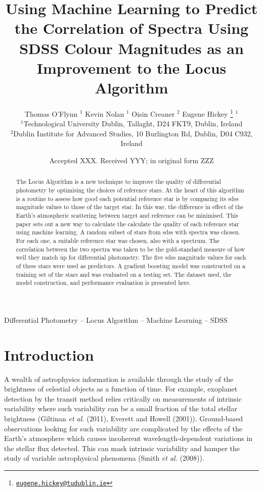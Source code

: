 \documentclass[a4paper,fleqn,usenatbib]{mnras}
\title[Predicting Correlation of Spectra Using SDSS Colour
Magnitudes]{Using Machine Learning to Predict the Correlation of Spectra
Using SDSS Colour Magnitudes as an Improvement to the Locus Algorithm}
\author[E. Hickey et al.]{
	Thomas O'Flynn
				$^{1}$
		Kevin Nolan
				$^{1}$
		Oisin Creaner
				$^{2}$
		Eugene Hickey
			\thanks{\href{mailto:eugene.hickey@tudublin.ie}{\nolinkurl{eugene.hickey@tudublin.ie}}}
				$^{1}$
	\\
			$^{1}$Technological University Dublin, Tallaght, D24 FKT9, Dublin,
Ireland\\
			$^{2}$Dublin Institute for Advanced Studies, 10 Burlington Rd,
Dublin, D04 C932, Ireland}
\date{Accepted XXX. Received YYY; in original form ZZZ}
\begin{document}
\label{firstpage}
\pagerange{\pageref{firstpage}--\pageref{lastpage}}


\maketitle

\begin{abstract}
The Locus Algorithm is a new technique to improve the quality of
differential photometry by optimising the choices of reference stars. At
the heart of this algorithm is a routine to assess how good each
potential reference star is by comparing its sdss magnitude values to
those of the target star. In this way, the difference in effect of the
Earth's atmospheric scattering between target and reference can be
minimised. This paper sets out a new way to calculate the calculate the
quality of each reference star using machine learning. A random subset
of stars from sdss with spectra was chosen. For each one, a suitable
reference star was chosen, also with a spectrum. The correlation between
the two spectra was taken to be the gold-standard measure of how well
they match up for differential photometry. The five sdss magnitude
values for each of these stars were used as predictors. A gradient
boosting model was constructed on a training set of the stars and was
evaluated on a testing set. The dataset used, the model construction,
and performance evaluation is presented here.
\end{abstract}

\begin{keywords}
Differential Photometry -- Locus Algorithm -- Machine Learning -- SDSS
\end{keywords}



\hypertarget{introduction}{%
\section{Introduction}\label{introduction}}

A wealth of astrophysics information is available through the study of
the brightness of celestial objects as a function of time. For example,
exoplanet detection by the transit method relies critically on
measurements of intrinsic variability where such variability can be a
small fraction of the total stellar brightness (Giltinan \emph{et al.}
(2011), Everett and Howell (2001)). Ground-based observations looking
for such variability are complicated by the effects of the Earth's
atmosphere which causes incoherent wavelength-dependent variations in
the stellar flux detected. This can mask intrinsic variability and
hamper the study of variable astrophysical phenomena (Smith \emph{et
al.} (2008)).
\end{document}
